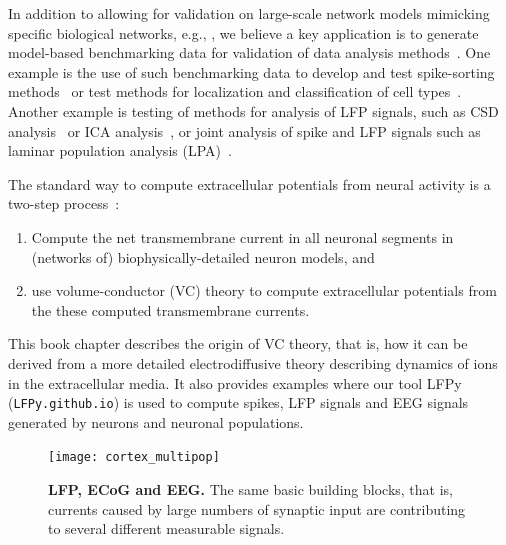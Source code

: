 \documentclass[preprint,11pt,authoryear]{elsarticle}
\begin{document}
In addition to allowing for validation on large-scale network models mimicking specific biological 
networks, e.g., \citet{Reimann2013,Markram2015,Billeh2020}, we believe a key application is to generate  
model-based benchmarking data for validation of data analysis methods~\citep{Denker2012}.
One example is the use of such benchmarking data to develop and test spike-sorting methods~\cite{Hagen2016, Buccino2019}
or test methods for localization and classification of cell types~\citep{DelgadoRuz2014, Buccino2018}.
Another example is testing of methods for analysis of LFP signals, such as CSD analysis~\citep{Pettersen2008,Leski2011,Ness2015} or 
ICA analysis~\citep{Glabska2014}, or joint analysis of spike and LFP signals such as laminar population analysis (LPA)~\citep{Glabska2016}.

The standard way to compute extracellular potentials from neural activity is a two-step process~\citep{Holt1999,Linden2014,Hagen2018}:
%
\begin{enumerate}
\item Compute the net transmembrane current in all neuronal segments in (networks of) biophysically-detailed neuron models, and
\item use volume-conductor (VC) theory to compute extracellular potentials from the these computed transmembrane currents.
\end{enumerate}
%
This book chapter describes the origin of VC theory, that is, how it can be derived from a more detailed electrodiffusive theory describing
dynamics of ions in the extracellular media. It also provides examples where our tool LFPy (\texttt{LFPy.github.io}) \citep{Linden2014,Hagen2018}
is used to compute spikes, LFP signals and EEG signals generated by neurons and neuronal populations.

\begin{figure}[!ht]
\begin{center}
\texttt{[image: cortex\_multipop]}
\end{center}
\caption{\textbf{LFP, ECoG and EEG.} The same basic building blocks, that is, currents caused by large numbers of synaptic input are contributing to several different measurable signals.
}
\label{fig:multimodal}
\end{figure}
\end{document}
